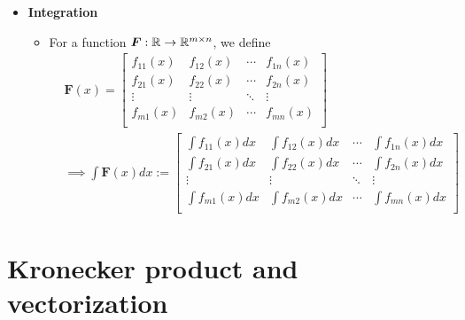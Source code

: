 \documentclass[12pt,a4paper]{article}
\begin{document}
\begin{itemize}
\item \textbf{Integration}
  \begin{itemize}
  \item For a function $\bm{F}:\mathbb{R} \to \mathbb{R}^{m\times n}$, we define
    \begin{align}
      & \bm{F}(x) =
      \begin{bmatrix}
        f_{11}(x) & f_{12}(x) & \cdots & f_{1n}(x) \\
        f_{21}(x) & f_{22}(x) & \cdots & f_{2n}(x) \\
        \vdots & \vdots & \ddots & \vdots \\
        f_{m1}(x) & f_{m2}(x) & \cdots & f_{mn}(x) \\
      \end{bmatrix} \nonumber \\
      & \implies
      \int\bm{F}(x)dx :=
      \begin{bmatrix}
        \int f_{11}(x)dx & \int f_{12}(x)dx & \cdots & \int f_{1n}(x)dx \\
        \int f_{21}(x)dx & \int f_{22}(x)dx & \cdots & \int f_{2n}(x)dx \\
        \vdots & \vdots & \ddots & \vdots \\
        \int f_{m1}(x)dx & \int f_{m2}(x)dx & \cdots & \int f_{mn}(x)dx \\
      \end{bmatrix}
    \nonumber%
    \end{align}
  \end{itemize}

\end{itemize}

\section{Kronecker product and vectorization}
\label{sec:Kronecker_product}
\end{document}
